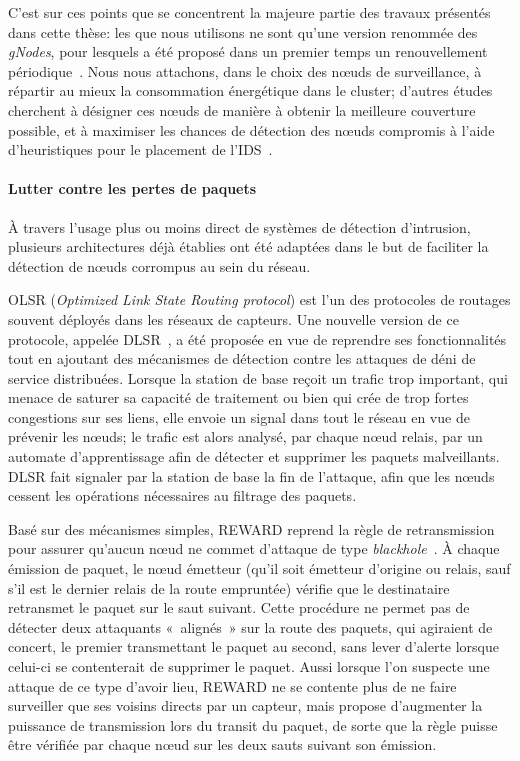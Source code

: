 C'est sur ces points que se concentrent la majeure partie des travaux présentés dans cette thèse: les \cns que nous utilisons ne sont qu'une version renommée des \textit{gNodes}, pour lesquels a été proposé dans un premier temps un renouvellement périodique~\cite{GMT12}.
Nous nous attachons, dans le choix des nœuds de surveillance, à répartir au mieux la consommation énergétique dans le cluster; d'autres études cherchent à désigner ces nœuds de manière à obtenir la meilleure couverture possible, et à maximiser les chances de détection des nœuds compromis à l'aide d'heuristiques pour le placement de l'IDS~\cite{INK09}.

        \paragraph{Lutter contre les pertes de paquets}
À travers l'usage plus ou moins direct de systèmes de détection d'intrusion, plusieurs architectures déjà établies ont été adaptées dans le but de faciliter la détection de nœuds corrompus au sein du réseau.

OLSR (\textit{Optimized Link State Routing protocol}) est l'un des protocoles de routages souvent déployés dans les réseaux de capteurs.
Une nouvelle version de ce protocole, appelée DLSR~\cite{MKASF10}, a été proposée en vue de reprendre ses fonctionnalités tout en ajoutant des mécanismes de détection contre les attaques de déni de service distribuées.
Lorsque la station de base reçoit un trafic trop important, qui menace de saturer sa capacité de traitement ou bien qui crée de trop fortes congestions sur ses liens, elle envoie un signal dans tout le réseau en vue de prévenir les nœuds; le trafic est alors analysé, par chaque nœud relais, par un automate d'apprentissage afin de détecter et supprimer les paquets malveillants.
DLSR fait signaler par la station de base la fin de l'attaque, afin que les nœuds cessent les opérations nécessaires au filtrage des paquets.

Basé sur des mécanismes simples, REWARD reprend la règle de retransmission pour assurer qu'aucun nœud ne commet d'attaque de type \textit{blackhole}~\cite{Kar05}.
À chaque émission de paquet, le nœud émetteur (qu'il soit émetteur d'origine ou relais, sauf s'il est le dernier relais de la route empruntée) vérifie que le destinataire retransmet le paquet sur le saut suivant.
Cette procédure ne permet pas de détecter deux attaquants « alignés » sur la route des paquets, qui agiraient de concert, le premier transmettant le paquet au second, sans lever d'alerte lorsque celui-ci se contenterait de supprimer le paquet.
Aussi lorsque l'on suspecte une attaque de ce type d'avoir lieu, REWARD ne se contente plus de ne faire surveiller que ses voisins directs par un capteur, mais propose d'augmenter la puissance de transmission lors du transit du paquet, de sorte que la règle puisse être vérifiée par chaque nœud sur les deux sauts suivant son émission.

